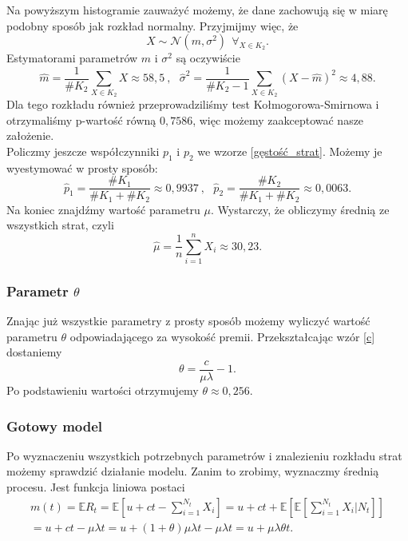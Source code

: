 \documentclass[12pt]{mwart}
\begin{document}
	\noindent Na powyższym histogramie zauważyć możemy, że dane zachowują się w miarę podobny sposób jak rozkład normalny. Przyjmijmy więc, że
	$$ X \sim \mathcal{N}(m, \sigma^2) \ \ \forall_{X \in K_2}. $$
	Estymatorami parametrów $m$ i $\sigma^2$ są oczywiście
	$$ \widehat{m} = \frac{1}{\mathrm{\#}K_2}\sum_{X \in K_2} X \approx 58,5\ , \ \ \ \widehat{\sigma}^2 = \frac{1}{\#K_2 - 1}\sum_{X \in K_2} (X - \widehat{m})^2 \approx 4,88. $$
	Dla tego rozkładu również przeprowadziliśmy test Kołmogorowa-Smirnowa i otrzymaliśmy p-wartość równą $0,7586$, więc możemy zaakceptować nasze założenie.
	\vspace{1.5mm}\\
	Policzmy jeszcze współczynniki $p_1$ i $p_2$ we wzorze \eqref{gęstość_strat}.
	Możemy je wyestymować w prosty sposób:
	$$ \widehat{p}_1 = \frac{\#K_1}{\#K_1 + \#K_2} \approx 0,9937\ , \ \ \ \widehat{p}_2 = \frac{\#K_2}{\#K_1 + \#K_2} \approx 0,0063. $$
	Na koniec znajdźmy wartość parametru $\mu$. Wystarczy, że obliczymy średnią ze wszystkich strat, czyli
	$$ \widehat{\mu} = \frac{1}{n} \sum_{i=1}^n X_i \approx 30,23. $$

	
	\subsubsection{Parametr {\boldmath $\theta$}}
	\noindent Znając już wszystkie parametry z prosty sposób możemy wyliczyć wartość parametru $\theta$ odpowiadającego za wysokość premii. Przekształcając wzór \eqref{c} dostaniemy
	$$ \theta = \frac{c}{\mu\lambda} - 1. $$
	Po podstawieniu wartości otrzymujemy $\theta \approx 0,256$.
	
	
	
	\subsubsection{Gotowy model}
	\noindent Po wyznaczeniu wszystkich potrzebnych parametrów i znalezieniu rozkładu strat możemy sprawdzić działanie modelu. Zanim to zrobimy, wyznaczmy średnią procesu. Jest funkcja liniowa postaci
	\begin{multline*}
		m(t) = \mathbb{E}R_t = \mathbb{E}\left[u + ct - \sum_{i=1}^{N_t} X_i \right] = u + ct + \mathbb{E}\left[ \mathbb{E}\left[ \sum_{i=1}^{N_t} X_i | N_t \right] \right]\\ = u + ct - \mu\lambda t = u + (1 + \theta)\mu\lambda t - \mu\lambda t = u + \mu\lambda\theta t.
	\end{multline*}
	
\end{document}
